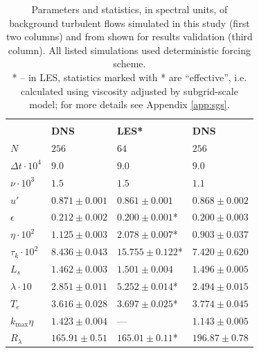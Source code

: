 \documentclass{pracamgren}
\begin{document}
\begin{table}[ht]
\centering
\begin{tabular}{llll}
 & & & \scriptsize{\textcite{Rosa2013}}  \\
 & \textbf{DNS} & \textbf{LES*} & \textbf{DNS}  \\ \hline
$N$ & $256$ & $64$ & $256$ \\
$\Delta t \cdot 10^{4}$ & $9.0$ & $9.0$ & $9.0$  \\
$\nu \cdot 10^{3}$ & $1.5$ & $1.5$ & $1.1$  \\

$u'$ & $0.871 \pm 0.001 $ & $0.861 \pm 0.001 $ & $0.868 \pm 0.002 $ \\
$\epsilon$ & $0.212 \pm 0.002 $ & $0.200 \pm 0.001$* & $0.200 \pm 0.003 $  \\

$\eta \cdot 10^{2}$ & $1.125 \pm 0.003$ & $2.078 \pm 0.007$* & $0.903 \pm 0.037$  \\
$\tau_{k} \cdot 10^{2}$ & $8.436 \pm 0.043$ & $15.755 \pm 0.122$* & $7.420 \pm 0.620$  \\
$L_{s}$ & $1.462 \pm 0.003$ & $1.501 \pm 0.004$ & $1.496 \pm 0.005$  \\
$\lambda \cdot 10$ & $2.851 \pm 0.011$ & $5.252 \pm 0.014$* & $2.494 \pm 0.015$  \\
$T_{e}$ & $3.616 \pm 0.028$ & $3.697 \pm 0.025$* & $3.774 \pm 0.045$  \\

$k_{\max} \eta$ & $1.423 \pm 0.004 $ & --- & $1.143 \pm 0.005 $  \\
$R_{\lambda}$ & $165.91 \pm 0.51 $ & $165.01 \pm 0.11$* & $196.87 \pm 0.78 $            
\end{tabular}
\caption{Parameters and statistics, in spectral units, of background turbulent flows simulated in this study (first two columns) and from \textcite{Rosa2013} shown for results validation (third column). 
All listed simulations used deterministic forcing scheme. \\
* -- in LES, statistics marked with * are ``effective'', i.e. calculated using viscosity adjusted by subgrid-scale model; for more details see Appendix \ref{app:sgs}.}
\label{tab:flow-stats}
\end{table}
\end{document}
